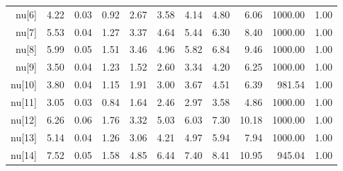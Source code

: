 \begin{longtable}{rrrrrrrrrrr}
  nu[6] & 4.22 & 0.03 & 0.92 & 2.67 & 3.58 & 4.14 & 4.80 & 6.06 & 1000.00 & 1.00 \\ 
  nu[7] & 5.53 & 0.04 & 1.27 & 3.37 & 4.64 & 5.44 & 6.30 & 8.40 & 1000.00 & 1.00 \\ 
  nu[8] & 5.99 & 0.05 & 1.51 & 3.46 & 4.96 & 5.82 & 6.84 & 9.46 & 1000.00 & 1.00 \\ 
  nu[9] & 3.50 & 0.04 & 1.23 & 1.52 & 2.60 & 3.34 & 4.20 & 6.25 & 1000.00 & 1.00 \\ 
  nu[10] & 3.80 & 0.04 & 1.15 & 1.91 & 3.00 & 3.67 & 4.51 & 6.39 & 981.54 & 1.00 \\ 
  nu[11] & 3.05 & 0.03 & 0.84 & 1.64 & 2.46 & 2.97 & 3.58 & 4.86 & 1000.00 & 1.00 \\ 
  nu[12] & 6.26 & 0.06 & 1.76 & 3.32 & 5.03 & 6.03 & 7.30 & 10.18 & 1000.00 & 1.00 \\ 
  nu[13] & 5.14 & 0.04 & 1.26 & 3.06 & 4.21 & 4.97 & 5.94 & 7.94 & 1000.00 & 1.00 \\ 
  nu[14] & 7.52 & 0.05 & 1.58 & 4.85 & 6.44 & 7.40 & 8.41 & 10.95 & 945.04 & 1.00 \\ 
   \hline
\hline
\end{longtable}
